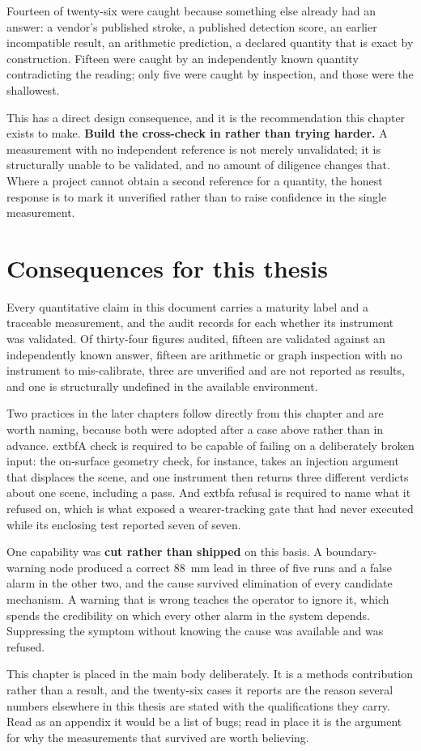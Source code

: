 Fourteen of twenty-six were caught because something else already had an
answer: a vendor's published stroke, a published detection score, an earlier
incompatible result, an arithmetic prediction, a declared quantity that is
exact by construction. Fifteen were caught by an independently known quantity contradicting
the reading; only five were caught by inspection, and those were the
shallowest.

This has a direct design consequence, and it is the recommendation this
chapter exists to make. \textbf{Build the cross-check in rather than trying
harder.} A measurement with no independent reference is not merely
unvalidated; it is structurally unable to be validated, and no amount of
diligence changes that. Where a project cannot obtain a second reference for a
quantity, the honest response is to mark it unverified rather than to raise
confidence in the single measurement.

\section{Consequences for this thesis}

Every quantitative claim in this document carries a maturity label and a
traceable measurement, and the audit records for each whether its instrument
was validated. Of thirty-four figures audited, fifteen are validated against an
independently known answer, fifteen are arithmetic or graph inspection with no
instrument to mis-calibrate, three are unverified and are not reported as
results, and one is structurally undefined in the available environment.

Two practices in the later chapters follow directly from this chapter and are
worth naming, because both were adopted after a case above rather than in
advance. 	extbf{A check is required to be capable of failing on a
deliberately broken input}: the on-surface geometry check, for instance, takes
an injection argument that displaces the scene, and one instrument then
returns three different verdicts about one scene, including a pass. And
	extbf{a refusal is required to name what it refused on}, which is what
exposed a wearer-tracking gate that had never executed while its enclosing
test reported seven of seven.

One capability was \textbf{cut rather than shipped} on this basis. A
boundary-warning node produced a correct \SI{88}{\milli\metre} lead in three of
five runs and a false alarm in the other two, and the cause survived
elimination of every candidate mechanism. A warning that is wrong teaches the
operator to ignore it, which spends the credibility on which every other alarm
in the system depends. Suppressing the symptom without knowing the cause was
available and was refused.

This chapter is placed in the main body deliberately. It is a methods
contribution rather than a result, and the twenty-six cases it reports are the
reason several numbers elsewhere in this thesis are stated with the
qualifications they carry. Read as an appendix it would be a list of bugs;
read in place it is the argument for why the measurements that survived are
worth believing.
